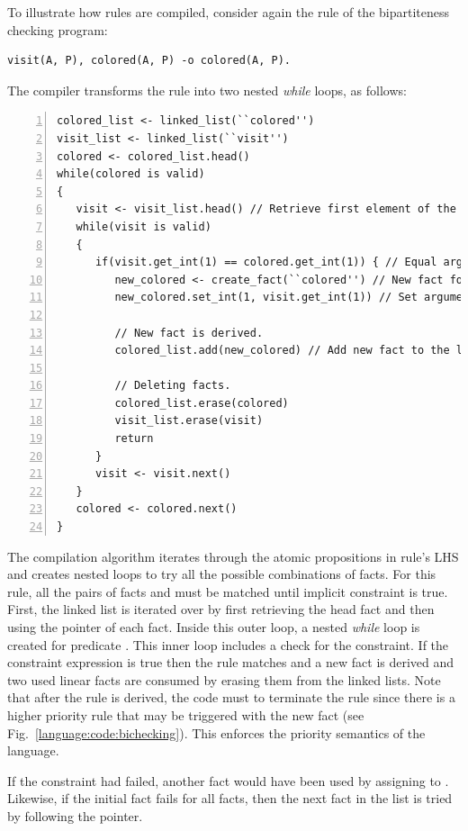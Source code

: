 To illustrate how rules are compiled, consider again the rule of the
bipartiteness checking program:

\begin{Verbatim}[fontsize=\codesize]
visit(A, P), colored(A, P) -o colored(A, P).
\end{Verbatim}

The compiler transforms the rule into two nested \emph{while} loops, as follows:

\begin{Verbatim}[numbers=left,fontsize=\codesize]
colored_list <- linked_list(``colored'')
visit_list <- linked_list(``visit'')
colored <- colored_list.head()
while(colored is valid)
{
   visit <- visit_list.head() // Retrieve first element of the list.
   while(visit is valid)
   {
      if(visit.get_int(1) == colored.get_int(1)) { // Equal arguments?
         new_colored <- create_fact(``colored'') // New fact for predicate colored.
         new_colored.set_int(1, visit.get_int(1)) // Set arguments.

         // New fact is derived.
         colored_list.add(new_colored) // Add new fact to the linked list.

         // Deleting facts.
         colored_list.erase(colored)
         visit_list.erase(visit)
         return
      }
      visit <- visit.next()
   }
   colored <- colored.next()
}
\end{Verbatim}

The compilation algorithm iterates through the atomic propositions in rule's LHS
and creates nested loops to try all the possible combinations of facts.  For
this rule, all the pairs of facts  and  must be
matched until implicit constraint is true. First, the  linked list
is iterated over by first retrieving the head fact and then using the
 pointer of each fact. Inside this outer loop, a nested \emph{while}
loop is created for predicate . This inner loop includes a check for
the constraint. If the constraint expression is true then the rule matches and a
new  fact is derived and two used linear facts are consumed by
erasing them from the linked lists. Note that after the rule is derived, the
code must  to terminate the rule since there is a higher priority
rule that may be triggered with the new  fact (see
Fig.~\ref{language:code:bichecking}). This enforces the priority semantics of
the language.
    
If the constraint had failed, another  fact would have been used by
assigning  to .  Likewise, if the initial
 fact fails for all  facts, then the next
 fact in the list is tried by following the  pointer.

